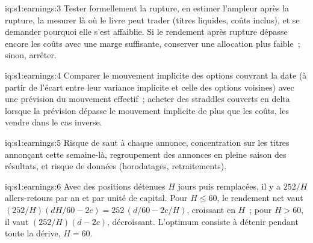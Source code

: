 \begin{solution}{iq:s1:earnings:3}
Tester formellement la rupture, en estimer l'ampleur après la rupture, la mesurer là où le livre peut trader (titres liquides, coûts inclus), et se demander pourquoi elle s'est affaiblie. Si
le rendement après rupture dépasse encore les coûts avec une marge suffisante, conserver une allocation plus faible~; sinon, arrêter.
\end{solution}

\begin{solution}{iq:s1:earnings:4}
Comparer le mouvement implicite des options couvrant la date (à partir de l'écart entre leur variance implicite et celle des options voisines) avec une
prévision du mouvement effectif~; acheter des straddles couverts en delta lorsque la prévision dépasse le mouvement implicite de plus que les coûts, les vendre dans le cas inverse.
\end{solution}

\begin{solution}{iq:s1:earnings:5}
Risque de saut à chaque annonce, concentration sur les titres annonçant cette semaine-là, regroupement des annonces en pleine saison des résultats, et risque de données (horodatages, retraitements).
\end{solution}

\begin{solution}{iq:s1:earnings:6}
Avec des positions détenues $H$ jours puis remplacées, il y a $252/H$ allers-retours par an et par unité de capital. Pour $H \le 60$, le rendement net vaut
$(252/H)(dH/60 - 2c) = 252\,(d/60 - 2c/H)$, croissant en $H$~; pour $H > 60$, il vaut $(252/H)(d - 2c)$, décroissant. L'optimum consiste à détenir pendant toute la dérive,
$H = 60$.
\end{solution}
